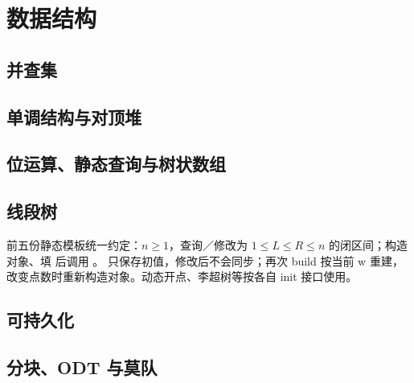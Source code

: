 \chapter{数据结构}
\begin{AlgorithmGroups}
\section{并查集}




\section{单调结构与对顶堆}



\section{位运算、静态查询与树状数组}





\section{线段树}
\label{ds:segment-conventions}
前五份静态模板统一约定：$n\ge1$，查询／修改为 $1\le L\le R\le n$ 的闭区间；构造对象、填  后调用 。 只保存初值，修改后不会同步；再次 build 按当前 w 重建，改变点数时重新构造对象。动态开点、李超树等按各自 init 接口使用。









\section{可持久化}


\section{分块、ODT 与莫队}




\end{AlgorithmGroups}
